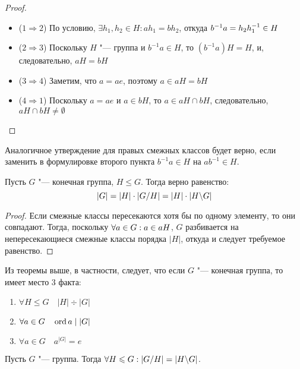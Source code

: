 \begin{proof}~
	\begin{itemize}
		\item ($1 \Rightarrow 2$) По условию, $\exists h_1, h_2 \in H: ah_1 = bh_2$, откуда $b^{-1}a \hm= h_2h_1^{-1} \in H$
		\item ($2 \Rightarrow 3$) Поскольку $H$ "--- группа и $b^{-1}a \in H$, то $(b^{-1}a)H = H$, и, следовательно, $aH = bH$
		\item ($3 \Rightarrow 4$) Заметим, что $a = ae$, поэтому $a \in aH = bH$
		\item ($4 \Rightarrow 1$) Поскольку $a = ae$ и $a \in bH$, то $a \in aH \cap bH$, следовательно, $aH \cap bH \ne \emptyset$
	\end{itemize}
\end{proof}

\begin{note}
	Аналогичное утверждение для правых смежных классов будет верно, если заменить в формулировке второго пункта $b^{-1}a \in H$ на $ab^{-1} \in H$.
\end{note}

\begin{theorem}[Лагранжа]
	Пусть $G$ "--- конечная группа, $H \le G$. Тогда верно равенство: 
	\[
		|G| = |H| \cdot |G / H| = |H| \cdot |H \backslash G|
	\]
\end{theorem}

\begin{proof}
	Если смежные классы пересекаются хотя бы по одному элементу, то они совпадают. Тогда, поскольку $\forall a \in G: a \hm\in aH$, $G$ разбивается на непересекающиеся смежные классы порядка $|H|$, откуда и следует требуемое равенство.
\end{proof}

\begin{reminder}
	Из теоремы выше, в частности, следует, что если $G$ "--- конечная группа, то имеет место 3 факта:
	\begin{enumerate}
		\item $\forall H \le G \quad |H| \div |G|$
		
		\item $\forall a \in G \quad \operatorname{ord}{a} \mid |G|$
		
		\item $\forall a \in G \quad a^{|G|} = e$
	\end{enumerate}
\end{reminder}

\begin{proposition}
	Пусть $G$ "--- группа. Тогда $\forall H \le G: |G / H| \hm= |H \bs G|$.
\end{proposition}

